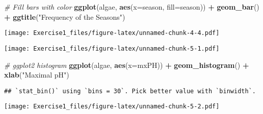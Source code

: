 \documentclass[
]{article}
\newenvironment{Shaded}{\begin{snugshade}}{\end{snugshade}}
\newcommand{\AttributeTok}[1]{\textcolor[rgb]{0.13,0.29,0.53}{#1}}
\newcommand{\CommentTok}[1]{\textcolor[rgb]{0.56,0.35,0.01}{\textit{#1}}}
\newcommand{\FunctionTok}[1]{\textcolor[rgb]{0.13,0.29,0.53}{\textbf{#1}}}
\newcommand{\NormalTok}[1]{#1}
\newcommand{\SpecialCharTok}[1]{\textcolor[rgb]{0.81,0.36,0.00}{\textbf{#1}}}
\newcommand{\StringTok}[1]{\textcolor[rgb]{0.31,0.60,0.02}{#1}}
\begin{document}
\begin{Shaded}
\begin{Highlighting}[]
\CommentTok{\# Fill bars with color}
\FunctionTok{ggplot}\NormalTok{(algae, }\FunctionTok{aes}\NormalTok{(}\AttributeTok{x=}\NormalTok{season, }\AttributeTok{fill=}\NormalTok{season)) }\SpecialCharTok{+}
\FunctionTok{geom\_bar}\NormalTok{() }\SpecialCharTok{+}
\FunctionTok{ggtitle}\NormalTok{(}\StringTok{"Frequency of the Seasons"}\NormalTok{)}
\end{Highlighting}
\end{Shaded}

\texttt{[image: Exercise1\_files/figure-latex/unnamed-chunk-4-4.pdf]}

\begin{Shaded}
\end{Shaded}

\texttt{[image: Exercise1\_files/figure-latex/unnamed-chunk-5-1.pdf]}

\begin{Shaded}
\begin{Highlighting}[]
\CommentTok{\# ggplot2 histogram}
\FunctionTok{ggplot}\NormalTok{(algae, }\FunctionTok{aes}\NormalTok{(}\AttributeTok{x=}\NormalTok{mxPH)) }\SpecialCharTok{+}
\FunctionTok{geom\_histogram}\NormalTok{() }\SpecialCharTok{+} \FunctionTok{xlab}\NormalTok{(}\StringTok{"Maximal pH"}\NormalTok{)}
\end{Highlighting}
\end{Shaded}

\begin{verbatim}
## `stat_bin()` using `bins = 30`. Pick better value with `binwidth`.
\end{verbatim}

\texttt{[image: Exercise1\_files/figure-latex/unnamed-chunk-5-2.pdf]}

\begin{Shaded}
\end{Shaded}
\end{document}
